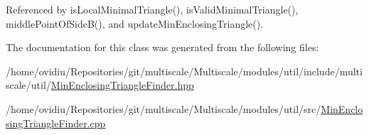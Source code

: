 \-Referenced by is\-Local\-Minimal\-Triangle(), is\-Valid\-Minimal\-Triangle(), middle\-Point\-Of\-Side\-B(), and update\-Min\-Enclosing\-Triangle().



\-The documentation for this class was generated from the following files\-:\begin{DoxyCompactItemize}
\item 
/home/ovidiu/\-Repositories/git/multiscale/\-Multiscale/modules/util/include/multiscale/util/\hyperlink{MinEnclosingTriangleFinder_8hpp}{\-Min\-Enclosing\-Triangle\-Finder.\-hpp}\item 
/home/ovidiu/\-Repositories/git/multiscale/\-Multiscale/modules/util/src/\hyperlink{MinEnclosingTriangleFinder_8cpp}{\-Min\-Enclosing\-Triangle\-Finder.\-cpp}\end{DoxyCompactItemize}
